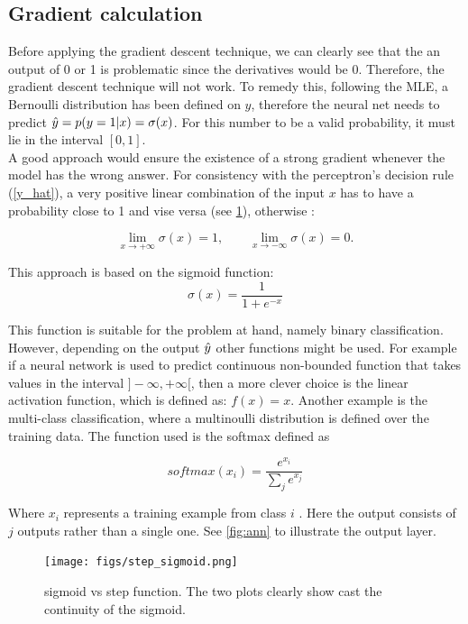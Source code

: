\subsection{Gradient calculation}\label{sec:cal_gradient}

Before applying the gradient descent technique, we can clearly see that the an output of 0 or 1 is problematic since the derivatives would be 0. Therefore, the gradient descent technique will not work. To remedy this, following the MLE, a Bernoulli distribution has been defined on $y$, therefore the neural net needs to predict $\hat{y} = p(y = 1 | x) = \sigma (x)$. For this number to be a valid probability, it must lie in the interval $[0, 1]$. \\
A good approach would ensure the existence of a strong gradient whenever the model has the wrong answer. For consistency with the perceptron's decision rule (\cref{y_hat}), a very positive linear combination of the input $x$ has to have a probability close to 1 and vise versa (see \cref{fig:step_sigmoid}), otherwise \cite{Ian16}:

\begin{equation}
  \label{equ:limits}
  \lim_{x \rightarrow +\infty} \sigma(x) = 1, \qquad \lim_{x \rightarrow -\infty} \sigma(x) = 0.
\end{equation}

This approach is based on the sigmoid function:
 $$
 \sigma(x) = \frac{1}{1 + e^{-x}}
 $$

This function is suitable for the problem at hand, namely binary classification. However, depending on the output $\hat{y}$ other functions might be used. For example if a neural network is used to predict continuous non-bounded function that takes values in the interval $]-\infty, +\infty[$, then a more clever choice is the linear activation function, which is defined as: $f(x) = x$. Another example is the multi-class classification, where a multinoulli distribution is defined over the training data. The function used is the softmax defined as

$$
softmax(x_i) = \frac{e^{x_i}}{\sum_j e^{x_j}}
$$

Where $x_i$ represents a training example from class $i$ \cite{Ian16}. Here the output consists of $j$ outputs rather than a single one. See \cref{fig:ann} to illustrate the output layer.

\begin{figure}[!htpb]
  \centering
  \texttt{[image: figs/step\_sigmoid.png]}
  \caption[sigmoid vs step function]{sigmoid vs step function. The two plots clearly show cast the continuity of the sigmoid.}\label{fig:step_sigmoid}
\end{figure}


